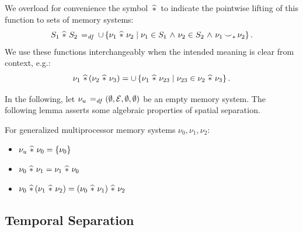 \documentclass[11pt]{report}
\begin{document}
We overload for convenience the symbol $\msep$ to indicate the pointwise lifting of this function to sets of memory systems: \[ S_1 \msep S_2 \eqdef \cup \setof{\nu_1 \msep \nu_2}{\nu_1 \in S_1 \conj \nu_2 \in S_2 \conj \nu_1 \compat_\sepsym \nu_2}.\] We use these functions interchangeably when the intended meaning is clear from context, e.g.: \[ \nu_1 \msep (\nu_2 \msep \nu_3) = \cup \setof{\nu_1 \msep \nu_{23}}{\nu_{23} \in \nu_2 \msep \nu_3}.\] 

In the following, let $\nu_u \eqdef (\nil, \arnil, \nil, \nil)$ be an empty memory system. The following lemma asserts some algebraic properties of spatial separation. \begin{lemma}
  \label{lem:spatial-separation-algebra}
  For generalized multiprocessor memory systems $\nu_0, \nu_1, \nu_2$: 
  \begin{itemize}
    \item $\nu_u \msep \nu_0 = \set{\nu_0}$
    \item $\nu_0 \msep \nu_1 = \nu_1 \msep \nu_0$
    \item $\nu_0 \msep (\nu_1 \msep \nu_2) = (\nu_0 \msep \nu_1) \msep \nu_2$
  \end{itemize}
\end{lemma}

\subsection{Temporal Separation}
\label{sec:temporal-separation}
\end{document}
